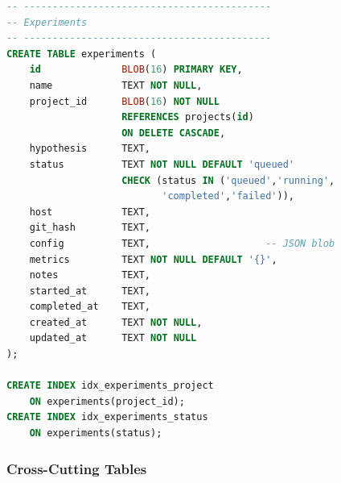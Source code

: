 \documentclass[11pt,a4paper]{article}
\begin{document}
\begin{lstlisting}[language=SQL, basicstyle=\ttfamily\footnotesize]
-- -------------------------------------------
-- Experiments
-- -------------------------------------------
CREATE TABLE experiments (
    id              BLOB(16) PRIMARY KEY,
    name            TEXT NOT NULL,
    project_id      BLOB(16) NOT NULL
                    REFERENCES projects(id)
                    ON DELETE CASCADE,
    hypothesis      TEXT,
    status          TEXT NOT NULL DEFAULT 'queued'
                    CHECK (status IN ('queued','running',
                           'completed','failed')),
    host            TEXT,
    git_hash        TEXT,
    config          TEXT,                    -- JSON blob
    metrics         TEXT NOT NULL DEFAULT '{}',
    notes           TEXT,
    started_at      TEXT,
    completed_at    TEXT,
    created_at      TEXT NOT NULL,
    updated_at      TEXT NOT NULL
);

CREATE INDEX idx_experiments_project
    ON experiments(project_id);
CREATE INDEX idx_experiments_status
    ON experiments(status);
\end{lstlisting}

\subsubsection*{Cross-Cutting Tables}
\end{document}
